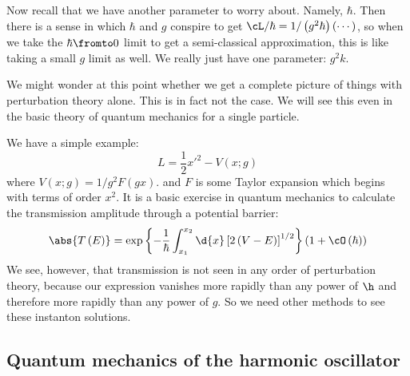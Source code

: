 \documentclass{booc}
\begin{document}
Now recall that we have another parameter to worry about. Namely, $\hbar$. 
Then there is a sense in which $\hbar$ and $g$ conspire to get
$\cL / \hbar = 1/ \left( g^2 \hbar \right)\left( \cdots \right)$, 
so when we take the $\hbar \fromto 0$ limit to get a semi-classical approximation, 
this is like taking a small $g$ limit as well. 
We really just have one parameter: $g^2 k$. 

We might wonder at this point whether we get a complete
picture of things with perturbation theory alone. 
This is in fact not the case. 
We will see this even in the basic theory of quantum mechanics
for a single particle.

\begin{exm}
We have a simple example:
\begin{equation}
L = \frac{1}{2} x'^2 - V\left( x ; g \right)
\end{equation}
where
$V\left( x ;g \right) = 1/g^2 F\left( gx \right)$. 
and $F$ is some Taylor expansion which
begins with terms of order $x^2$. 
It is a basic exercise in quantum mechanics to
calculate the transmission amplitude through a potential barrier:
\begin{equation}
\abs{T\left( E \right)} = 
\exp\left\{ -\frac{1}{\hbar} \int_{x_1}^{x_2} \d{x}
\left[ 2\left( V-E \right) \right]^{1/2}\right\} \left( 1 + \cO\left( \hbar \right) \right)
\end{equation}
We see, however, that transmission is not seen
in any order of perturbation theory, because
our expression vanishes more rapidly than any power of $\h$
and therefore more rapidly than any power of $g$.
So we need other methods to see these instanton solutions.
\end{exm}

\subsection{Quantum mechanics of the harmonic oscillator}
\end{document}
